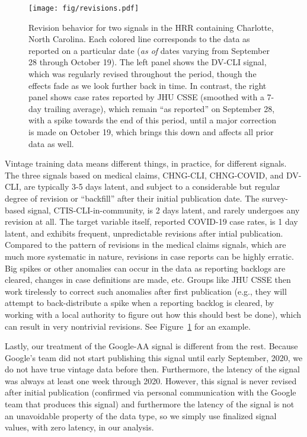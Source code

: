 \documentclass[9pt,twocolumn,twoside,lineno]{pnas-new}
\begin{document}
\begin{figure}[tb!]
  \texttt{[image: fig/revisions.pdf]}
  \caption{Revision behavior for two signals in the HRR containing Charlotte,
    North Carolina.  Each colored line corresponds to the data as reported on a
    particular 
    date (\textit{as of} dates varying from September 28 through October
    19). The left panel shows the DV-CLI signal, which was regularly revised
    throughout the period, though the effects fade as we look further back in   
    time. In contrast, the right panel shows case rates reported by JHU CSSE
    (smoothed with a 7-day trailing average), which remain ``as reported'' on
    September 28, with a spike towards the end of this period, until a major
    correction is made on October 19, which brings this down and affects all
    prior data as well.}  
  \label{fig:vintage}
\end{figure}

Vintage training data means different things, in practice, for different
signals. The three signals based on medical claims, CHNG-CLI, CHNG-COVID, and
DV-CLI, are typically 3-5 days latent, and subject to a considerable but
regular degree of revision or ``backfill'' after their initial publication date.
The survey-based signal, CTIS-CLI-in-community, is 2 days latent, and rarely
undergoes any revision at all.  The target variable itself, reported COVID-19
case rates, is 1 day latent, and exhibits frequent, unpredictable revisions
after intial publication.  Compared to the pattern of revisions in the medical 
claims signals, which are much more systematic in nature, revisions in case
reports can be highly erratic. Big spikes or other anomalies can occur in the
data as reporting backlogs are cleared, changes in case definitions are made,
etc. Groups like JHU CSSE then work tirelessly to correct such anomalies after
first publication (e.g., they will attempt to back-distribute a spike when a
reporting backlog is cleared, by working with a local authority to figure out
how this should best be done), which can result in very nontrivial revisions.
See Figure~\ref{fig:vintage} for an example. 

Lastly, our treatment of the Google-AA signal is different from the rest.
Because Google's team did not start publishing this signal until early
September, 2020, we do not have true vintage data before then.  Furthermore, the
latency of the signal was always at least one week through 2020.  However, this
signal is never revised after initial publication (confirmed via personal
communication with the Google team that produces this signal) and furthermore
the latency of the signal is not an unavoidable property of the data type, so we
simply use finalized signal values, with zero latency, in our analysis.   
\end{document}
